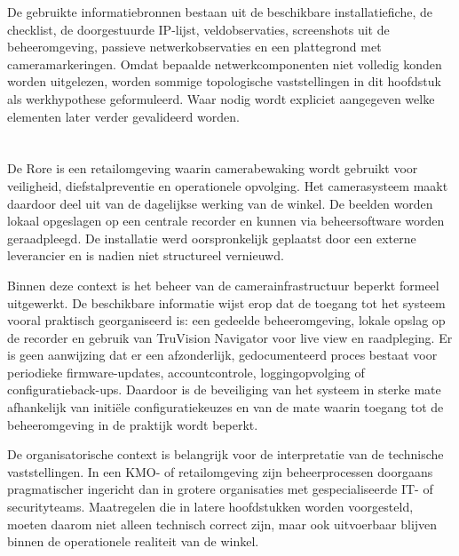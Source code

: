 De gebruikte informatiebronnen bestaan uit de beschikbare installatiefiche, de checklist, de doorgestuurde IP-lijst, veldobservaties, screenshots uit de beheeromgeving, passieve netwerkobservaties en een plattegrond met cameramarkeringen. Omdat bepaalde netwerkcomponenten niet volledig konden worden uitgelezen, worden sommige topologische vaststellingen in dit hoofdstuk als werkhypothese geformuleerd. Waar nodig wordt expliciet aangegeven welke elementen later verder gevalideerd worden.

\section{}%
\label{sec:context-organisatorisch}

De Rore is een retailomgeving waarin camerabewaking wordt gebruikt voor veiligheid, diefstalpreventie en operationele opvolging. Het camerasysteem maakt daardoor deel uit van de dagelijkse werking van de winkel. De beelden worden lokaal opgeslagen op een centrale recorder en kunnen via beheersoftware worden geraadpleegd. De installatie werd oorspronkelijk geplaatst door een externe leverancier en is nadien niet structureel vernieuwd.

Binnen deze context is het beheer van de camerainfrastructuur beperkt formeel uitgewerkt. De beschikbare informatie wijst erop dat de toegang tot het systeem vooral praktisch georganiseerd is: een gedeelde beheeromgeving, lokale opslag op de recorder en gebruik van TruVision Navigator voor live view en raadpleging. Er is geen aanwijzing dat er een afzonderlijk, gedocumenteerd proces bestaat voor periodieke firmware-updates, accountcontrole, loggingopvolging of configuratieback-ups. Daardoor is de beveiliging van het systeem in sterke mate afhankelijk van initiële configuratiekeuzes en van de mate waarin toegang tot de beheeromgeving in de praktijk wordt beperkt.

De organisatorische context is belangrijk voor de interpretatie van de technische vaststellingen. In een KMO- of retailomgeving zijn beheerprocessen doorgaans pragmatischer ingericht dan in grotere organisaties met gespecialiseerde IT- of securityteams. Maatregelen die in latere hoofdstukken worden voorgesteld, moeten daarom niet alleen technisch correct zijn, maar ook uitvoerbaar blijven binnen de operationele realiteit van de winkel.

\section{}%
\label{sec:context-infrastructuur}

